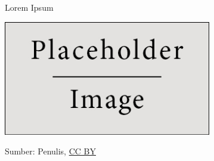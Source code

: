 \documentclass[main.tex]{subfiles}
\begin{document}
\begin{frame}{Lorem Ipsum}
	\small \lipsum[1][1-2]


	\begin{center}
		\includegraphics[height=5cm]{figures/placeholder}

		{\tiny \textcolor{digiPH_darkorange}{Sumber: Penulis, \href{https://creativecommons.org/licenses/by/3.0/at/}{CC BY}}}
	\end{center}
\end{frame}


\end{document}
